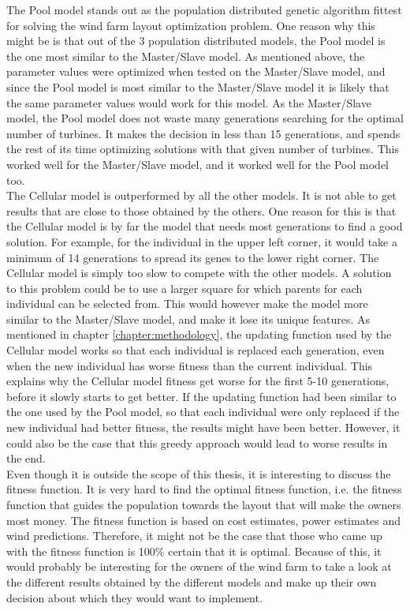 \noindent The Pool model stands out as the population distributed genetic algorithm fittest for solving the wind farm layout optimization problem. One reason why this might be is that out of the 3 population distributed models, the Pool model is the one most similar to the Master/Slave model. As mentioned above, the parameter values were optimized when tested on the Master/Slave model, and since the Pool model is most similar to the Master/Slave model it is likely that the same parameter values would work for this model. As the Master/Slave model, the Pool model does not waste many generations searching for the optimal number of turbines. It makes the decision in less than 15 generations, and spends the rest of its time optimizing solutions with that given number of turbines. This worked well for the Master/Slave model, and it worked well for the Pool model too. \\

\noindent The Cellular model is outperformed by all the other models. It is not able to get results that are close to those obtained by the others. One reason for this is that the Cellular model is by far the model that needs most generations to find a good solution. For example, for the individual in the upper left corner, it would take a minimum of 14 generations to spread its genes to the lower right corner. The Cellular model is simply too slow to compete with the other models. A solution to this problem could be to use a larger square for which parents for each individual can be selected from. This would however make the model more similar to the Master/Slave model, and make it lose its unique features. As mentioned in chapter \ref{chapter:methodology}, the updating function used by the Cellular model works so that each individual is replaced each generation, even when the new individual has worse fitness than the current individual. This explains why the Cellular model fitness get worse for the first 5-10 generations, before it slowly starts to get better. If the updating function had been similar to the one used by the Pool model, so that each individual were only replaced if the new individual had better fitness, the results might have been better. However, it could also be the case that this greedy approach would lead to worse results in the end.\\

\noindent Even though it is outside the scope of this thesis, it is interesting to discuss the fitness function. It is very hard to find the optimal fitness function, i.e. the fitness function that guides the population towards the layout that will make the owners most money. The fitness function is based on cost estimates, power estimates and wind predictions. Therefore, it might not be the case that those who came up with the fitness function is 100\% certain that it is optimal. Because of this, it would probably be interesting for the owners of the wind farm to take a look at the different results obtained by the different models and make up their own decision about which they would want to implement.\\

